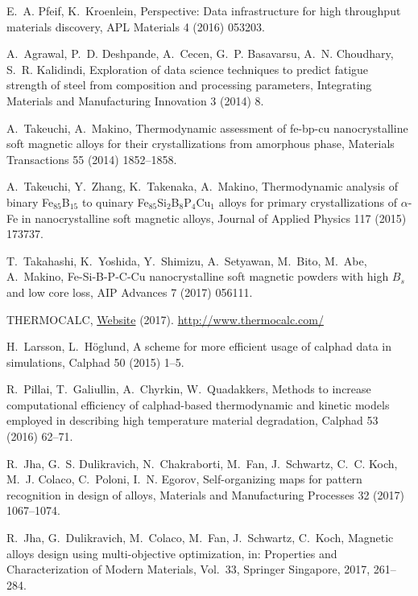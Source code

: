 \begin{thebibliography}{10}
E.~A. Pfeif, K.~Kroenlein,
{Perspective: Data
  infrastructure for high throughput materials discovery}, APL Materials 4
  (2016) 053203.

A.~Agrawal, P.~D. Deshpande, A.~Cecen, G.~P. Basavarsu, A.~N. Choudhary, S.~R.
  Kalidindi, {Exploration of data
  science techniques to predict fatigue strength of steel from composition and
  processing parameters}, Integrating Materials and Manufacturing Innovation
  3 (2014) 8.

A.~Takeuchi, A.~Makino, Thermodynamic assessment of fe-bp-cu nanocrystalline
  soft magnetic alloys for their crystallizations from amorphous phase,
  Materials Transactions 55 (2014) 1852--1858.

A.~Takeuchi, Y.~Zhang, K.~Takenaka, A.~Makino, Thermodynamic analysis of binary
  Fe$_{85}$B$_{15}$ to quinary Fe$_{85}$Si$_2$B$_8$P$_4$Cu$_1$ alloys for primary crystallizations of
  $\alpha$-Fe in nanocrystalline soft magnetic alloys, Journal of Applied
  Physics 117 (2015) 173737.

T.~Takahashi, K.~Yoshida, Y.~Shimizu, A.~Setyawan, M.~Bito, M.~Abe, A.~Makino,
  Fe-Si-B-P-C-Cu nanocrystalline soft magnetic powders with high $B_s$ and low core
  loss, AIP Advances 7 (2017) 056111.

THERMOCALC, \href{http://www.thermocalc.com/}{Website} (2017).
\newline\urlprefix\url{http://www.thermocalc.com/}

H.~Larsson, L.~H{\"o}glund, A scheme for more efficient usage of calphad data
  in simulations, Calphad 50 (2015) 1--5.

R.~Pillai, T.~Galiullin, A.~Chyrkin, W.~Quadakkers, Methods to increase
  computational efficiency of calphad-based thermodynamic and kinetic models
  employed in describing high temperature material degradation, Calphad 53
  (2016) 62--71.

R.~Jha, G.~S. Dulikravich, N.~Chakraborti, M.~Fan, J.~Schwartz, C.~C. Koch,
  M.~J. Colaco, C.~Poloni, I.~N. Egorov, Self-organizing maps for pattern
  recognition in design of alloys, Materials and Manufacturing Processes 32
  (2017) 1067--1074.

R.~Jha, G.~Dulikravich, M.~Colaco, M.~Fan, J.~Schwartz, C.~Koch, Magnetic
  alloys design using multi-objective optimization, in: Properties and
  Characterization of Modern Materials, Vol.~33, Springer Singapore, 2017,
  261--284.


\end{thebibliography}
